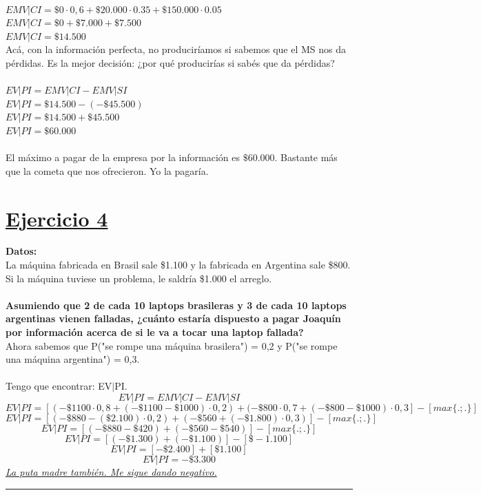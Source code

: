 \documentclass{article}
\newcommand{\ulcolor}[2][Red]{\setulcolor{#1}\ul{#2}}
\newcommand*\sepline{%
  \begin{center}
    \rule[1ex]{.5\textwidth}{.5pt}
  \end{center}}
\begin{document}
        \\
        $EMV | CI = \$0 \cdot 0,6 + \$20.000 \cdot 0.35 + \$150.000 \cdot 0.05$
        \\
        $EMV | CI = \$0 + \$7.000 + \$7.500$
        \\
        $EMV | CI = \$14.500$
        \\
        Acá, con la información perfecta, no produciríamos si sabemos que el MS nos da pérdidas. Es la mejor decisión: ¿por qué producirías si sabés que da pérdidas?
        \\
        \\
        $EV | PI = EMV | CI - EMV | SI$
        \\
        $EV | PI = \$14.500 - (-\$45.500)$
        \\
        $EV | PI = \$14.500 + \$45.500$
        \\
        $EV | PI = \$60.000$
        \\
        \\
        El máximo a pagar de la empresa por la información es $\$60.000$. Bastante más que la cometa que nos ofrecieron. Yo la pagaría.
    \section*{\underline{Ejercicio 4}}
        \textbf{Datos:}
        \\
        La máquina fabricada en Brasil sale \$1.100 y la fabricada en Argentina sale \$800.
        \\
        Si la máquina tuviese un problema, le saldría \$1.000 el arreglo.
        \\
        \\
        \textbf{Asumiendo que 2 de cada 10 laptops brasileras y 3 de cada 10 laptops argentinas vienen falladas, ¿cuánto estaría dispuesto a pagar Joaquín por información acerca de si le va a tocar una laptop fallada?}
        \\
        Ahora sabemos que P("se rompe una máquina brasilera") = 0,2 y P("se rompe una máquina argentina") = 0,3.
        \\
        \\
        Tengo que encontrar: EV$|$PI.
        \\
        \[EV|PI = EMV|CI - EMV|SI\]
        \[EV|PI = [(-\$1100 \cdot 0,8 + (-\$1100 -\$1000) \cdot 0,2)+(-\$800 \cdot 0,7 + (-\$800 -\$1000) \cdot 0,3] - [max\{.; .\}]\]
        \[EV|PI = [(-\$880 - (\$2.100) \cdot 0,2) + (-\$560 + (-\$1.800) \cdot 0,3)] - [max\{.; .\}]\]
        \[EV|PI = [(-\$880 - \$420) + (-\$560 -\$540)] - [max\{.; .\}]\]
        \[EV|PI = [(-\$1.300) + (-\$1.100)] - [\$-1.100]\]
        \[EV|PI = [-\$2.400] + [\$1.100]\]
        \[EV|PI = -\$3.300\]
        \textit{\ulcolor[Red]{La puta madre también. Me sigue dando negativo.}}
\\
    \sepline
\end{document}
